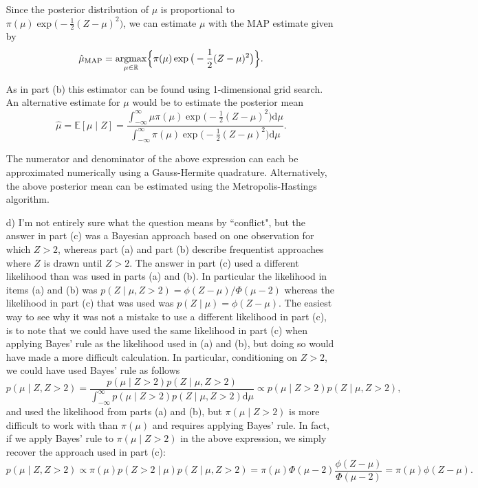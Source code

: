 \begin{enumerate}
Since the posterior distribution of $\mu$ is proportional to $\pi(\mu)  \exp \big( -\frac{1}{2} (Z-\mu)^2 \big)$, we can estimate $\mu$ with the MAP estimate given by $$\hat{\mu}_{\text{MAP}} =\operatorname*{argmax}_{\mu \in \mathbb{R}}  \Bigl\{ \pi(\mu)  \exp \big( -\frac{1}{2} (Z-\mu)^2 \big) \Bigr\}.$$

As in part (b) this estimator can be found using 1-dimensional grid search. An alternative estimate for $\mu$ would be to estimate the posterior mean $$\hat{\mu} =\mathbb{E}[ \mu \mid Z]= \frac{\int_{-\infty}^{\infty} \mu \pi(\mu)  \exp \big( -\frac{1}{2} (Z-\mu)^2 \big) \text{d} \mu}{ \int_{-\infty}^{\infty} \pi(\mu)  \exp \big( -\frac{1}{2} (Z-\mu)^2 \big) \text{d} \mu}.$$

The numerator and denominator of the above expression can each be approximated numerically using a Gauss-Hermite quadrature. Alternatively, the above posterior mean can be estimated using the Metropolis-Hastings algorithm.



\item[d)] I'm not entirely sure what the question means by ``conflict", but the answer in part (c) was a Bayesian approach based on one observation for which $Z>2$, whereas part (a) and part (b) describe frequentist approaches where $Z$ is drawn until $Z>2$. The answer in part (c) used a different likelihood than was used in parts (a) and (b). In particular the likelihood in items (a) and (b) was $p(Z \mid \mu,Z>2)=\phi(Z-\mu)/\Phi(\mu -2)$ whereas the likelihood in part (c) that was used was $p(Z \mid \mu)=\phi(Z-\mu)$. The easiest way to see why it was not a mistake to use a different likelihood in part (c), is to note that we could have used the same likelihood in part (c) when applying Bayes' rule as the likelihood used in (a) and (b), but doing so would have made a more difficult calculation. In particular, conditioning on $Z>2$, we could have used Bayes' rule as follows $$p( \mu \mid Z , Z> 2 ) = \frac{ p(\mu \mid Z>2) p(Z \mid \mu ,Z>2) }{\int_{-\infty}^{\infty} p(\mu \mid Z>2) p(Z \mid \mu , Z>2) \text{d} \mu } \propto p(\mu \mid Z>2) p(Z \mid \mu,Z>2),$$ and used the likelihood from parts (a) and (b), but $\pi(\mu \mid Z>2)$ is more difficult to work with than $\pi(\mu)$ and requires applying Bayes' rule. In fact, if we apply Bayes' rule to $\pi(\mu \mid Z>2)$ in the above expression, we simply recover the approach used in part (c): $$p( \mu \mid Z , Z> 2 ) \propto  \pi(\mu) p(Z >2 \mid \mu) p(Z \mid \mu, Z>2)=\pi(\mu)  \Phi(\mu-2) \frac{\phi(Z-\mu)}{\Phi(\mu -2)}=\pi(\mu) \phi(Z-\mu).$$

\end{enumerate}



